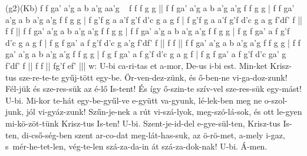 \documentclass[twoside]{article}
\begin{document}
\begin{aretino}
(g2)(Kb) f f ga' a'g a b a'g aa'g ~ f f f g g || f f ga' a'g a b a'g a'g f f g g | f f ga' a'g a b a'g a'g f f g g | f g'f g a a'f g'f d'c g a g f | f g'f g a a'f g'f d'c g a g f'df' f || f f || f f ga' a'g a b a'g a'g f f g g | f f ga' a'g a b a'g a'g f f g g | f g f ga' a f g'f d'c g a g f | f g f ga' a f g'f d'c g a'g f'df' f || f f || f f ga' a'g a b a'g a'g f f g g | f f ga' a'g a b a'g a'g f f g g | f g f ga' a f g'f d'c g a g f | f g f ga' a f g'f d'c ga' g f'df' f || f f || fg'f ef' |||
w: U-bi ca-ri-tas et a-mor, De-us i-bi est. Min-ket Krisz-tus sze-re-te-te gyűj-tött egy-be. Ör-ven-dez-zünk, és ő-ben-ne vi-ga-doz-zunk! Fél-jük és sze-res-sük az é-lő Is-tent! És így ő-szin-te szív-vel sze-res-sük egy-mást! U-bi. Mi-kor te-hát egy-be-gyűl-ve e-gyütt va-gyunk, lé-lek-ben meg ne o-szol-junk, jól vi-gyáz-zunk! Szűn-je-nek a rút vi-szá-lyok, meg-szó-lá-sok, és ott le-gyen mi-kö-zöt-tünk Krisz-tus Is-ten! U-bi. Szent-je-id-del e-gye-sül-ten, Krisz-tus Is-ten, di-cső-ség-ben szent ar-co-dat meg-lát-has-suk, az ö-rö-met, a-mely i-gaz, s~mér-he-tet-len, vég-te-len szá-za-da-in át szá-za-dok-nak! U-bi. Á-men.
\end{aretino}



\end{document}
